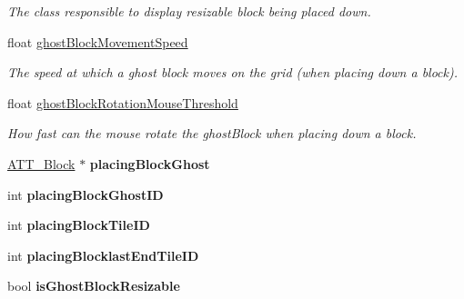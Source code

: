 \begin{DoxyCompactItemize}
\begin{DoxyCompactList}\small\item\em The class responsible to display resizable block being placed down. \end{DoxyCompactList}\item 
float \mbox{\hyperlink{class_a_t_t___player_grid_camera_a42de37b02c9b4d9dfd47d5296a550b3b}{ghost\+Block\+Movement\+Speed}}
\begin{DoxyCompactList}\small\item\em The speed at which a ghost block moves on the grid (when placing down a block). \end{DoxyCompactList}\item 
float \mbox{\hyperlink{class_a_t_t___player_grid_camera_aedbba22f216af5eddc3ce9b7d9501ee2}{ghost\+Block\+Rotation\+Mouse\+Threshold}}
\begin{DoxyCompactList}\small\item\em How fast can the mouse rotate the ghost\+Block when placing down a block. \end{DoxyCompactList}\item 
\mbox{\label{class_a_t_t___player_grid_camera_a4228c0b739f9d595b8494f2694e6ce26}} 
\mbox{\hyperlink{class_a_t_t___block}{A\+T\+T\+\_\+\+Block}} $\ast$ {\bfseries placing\+Block\+Ghost}
\item 
\mbox{\label{class_a_t_t___player_grid_camera_aa11576a1a84082ca5b4b1300179063d0}} 
int {\bfseries placing\+Block\+Ghost\+ID}
\item 
\mbox{\label{class_a_t_t___player_grid_camera_a8a30993f653202fa40ca4a32737fa3fb}} 
int {\bfseries placing\+Block\+Tile\+ID}
\item 
\mbox{\label{class_a_t_t___player_grid_camera_a814f5a90ba94174b00158a37682bdff7}} 
int {\bfseries placing\+Blocklast\+End\+Tile\+ID}
\item 
\mbox{\label{class_a_t_t___player_grid_camera_a94856f64687087eb48ef31ec11928074}} 
bool {\bfseries is\+Ghost\+Block\+Resizable}
\item 
\mbox{\label{class_a_t_t___player_grid_camera_ae239de13e96934f7e03ed42301225fa1}} 

\end{DoxyCompactItemize}
